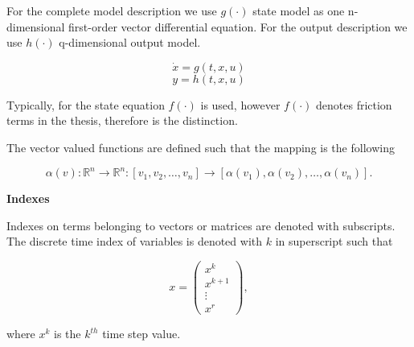 \vspace{-2mm}
For the complete model description we use $g(\cdot)$ state model as one n-dimensional first-order vector differential equation. For the output description we use $h(\cdot)$ q-dimensional output model. 

\vspace{-6mm}
\begin{equation*}
\dot{x} = g(t,x,u)
\end{equation*}
\vspace{-8mm}
\begin{equation*}
y = h(t,x,u)
\end{equation*}
\vspace{-6mm}

Typically, for the state equation $f(\cdot)$ is used, however $f(\cdot)$ denotes friction terms in the thesis, therefore is the distinction. 

The vector valued functions are defined such that the mapping is the following

\vspace{-4mm}
 \begin{equation*}
 \alpha(v) : {\mathbb{R}}^{n} \rightarrow {\mathbb{R}}^{n} : [v_1, v_2, \hdots, v_n] \rightarrow [\alpha(v_1), \alpha(v_2),\hdots,\alpha(v_n)].
 \end{equation*}

 \textbf{Indexes}

 Indexes on terms belonging to vectors or matrices are denoted with subscripts. The discrete time index of variables is denoted with $k$ in superscript such that 

\vspace{-6mm}
\begin{equation*}
 x = 
 \begin{pmatrix}

 		 x^k 	\\
		 x^{k+1} 	\\
 		 \vdots \\
		 x^r

 \end{pmatrix},
 \end{equation*}
 \vspace{-6mm}

 where $x^k$ is the $k^{th}$ time step value. 



